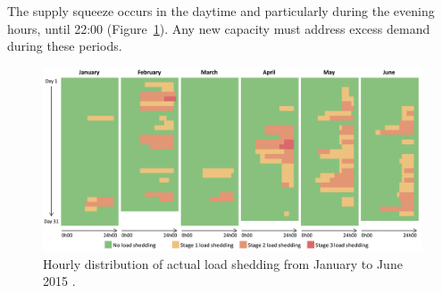
The supply squeeze occurs in the daytime and particularly during the evening hours, until 22:00 (Figure~\ref{Load_shedding}). Any new capacity must address excess demand during these periods.

\begin{figure}[htbp]  
\centering
\includegraphics[width=1\linewidth]{FIG/Load_shedding}
\caption[Hourly distribution of load shedding from January to June 2015.]{Hourly distribution of actual load shedding from January to June 2015 \cite{CSIREnergyCentre2015}.}\label{Load_shedding}
\end{figure}


